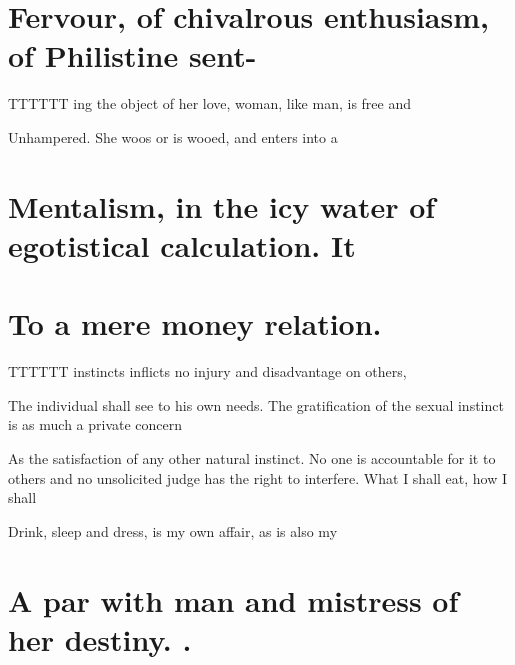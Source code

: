 \section{Fervour, of chivalrous enthusiasm, of Philistine sent-}
 \par 
TTTTTT ing the object of her love, woman, like man, is free and
 \par 
Unhampered. She woos or is wooed, and enters into a
 \par 
\section{Mentalism, in the icy water of egotistical calculation. It}
 \par 
\section{To a mere money relation.}
 \par 
TTTTTT instincts inflicts no injury and disadvantage on others,
 \par 
The individual shall see to his own needs. The gratification of the sexual instinct is as much a private concern
 \par 
As the satisfaction of any other natural instinct. No one is accountable for it to others and no unsolicited judge has the right to interfere. What I shall eat, how I shall
 \par 
Drink, sleep and dress, is my own affair, as is also my
 \par 
\section{A par with man and mistress of her destiny. .}
 \par 
